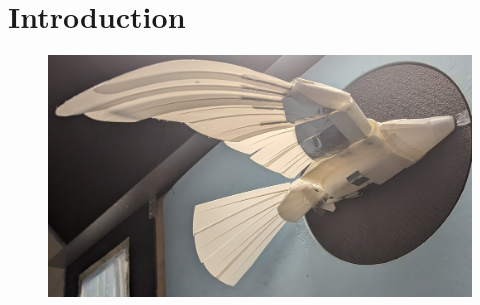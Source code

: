 \section{Introduction}


    \setlength{\intextsep}{0pt}
    \begin{figure}
        \includegraphics[width=\textwidth/2]{./Resources/Kestrel.jpg}
    \end{figure}

